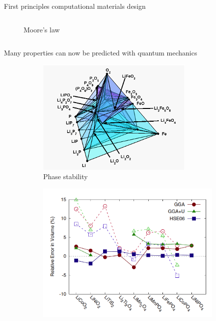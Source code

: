 \documentclass[aspectratio=169]{beamer}
\begin{document}
\begin{frame}{First principles computational materials design}
\begin{columns}
\begin{figure}
                \caption{Moore's law}
            \end{figure}
        \end{columns}

    \end{frame}


    \begin{frame}{Many properties can now be predicted with quantum mechanics}
        \begin{figure}
            \centering
            \begin{subfigure}{0.2\textwidth}
                \includegraphics[width=\linewidth]{lectures/figures/1_phase_diagram.png}
                \caption{Phase stability\cite{ongLiFeO22008}}
            \end{subfigure}
            \begin{subfigure}{0.2\textwidth}
                \includegraphics[width=\linewidth]{lectures/figures/1_Voltage.png}

\end{subfigure}
\end{figure}
\end{frame}
\end{document}

